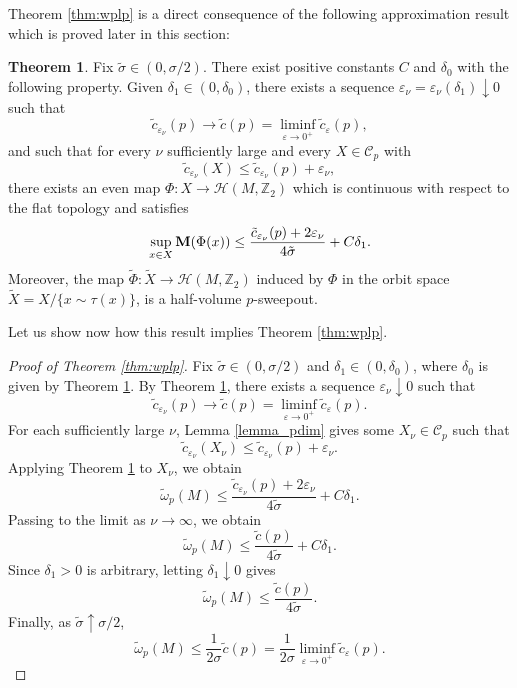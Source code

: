 \documentclass[12pt,english]{article}
\theoremstyle{definition}
\newtheorem{theorem}{Theorem}[section]
\begin{document}
Theorem \ref{thm:wplp} is a direct consequence of the following approximation result which is proved later in this section:

\begin{theorem} \label{thm:comp}
Fix $\tilde \sigma \in (0,\sigma/2)$. There exist positive constants $C$ and $\delta_0$ with the following property. Given $\delta_1 \in (0,\delta_0)$, there exists a sequence $\varepsilon_\nu=\varepsilon_\nu(\delta_1)\downarrow 0$ such that
\[
\tilde c_{\varepsilon_\nu}(p)\to \tilde c(p)=\liminf_{\varepsilon\to 0^+}\tilde c_\varepsilon(p),
\]
and such that for every $\nu$ sufficiently large and every $X \in \mathcal{C}_p$ with
\[
\tilde c_{\varepsilon_\nu}(X) \leq \tilde c_{\varepsilon_\nu}(p)+\varepsilon_\nu,
\]
there exists an even map $\Phi:X \to \mathcal H(M, \mathbb{Z}_2)$ which is continuous with respect to the flat topology and satisfies
\[
\sup_{x \in X} {\bf M}(\Phi(x)) \leq \frac{\tilde c_{\varepsilon_\nu}(p)+2\varepsilon_\nu}{4\tilde \sigma} + C\delta_1.
\]
Moreover, the map $\tilde \Phi:\tilde X \to \mathcal H(M, \mathbb{Z}_2)$ induced by $\Phi$ in the orbit space $\tilde X=X/\{x\sim \tau(x)\}$, is a half-volume $p$-sweepout.
\end{theorem}

Let us show now how this result implies Theorem \ref{thm:wplp}.

\begin{proof}[Proof of Theorem \ref{thm:wplp}]
Fix $\tilde \sigma \in (0,\sigma/2)$ and $\delta_1\in(0,\delta_0)$, where $\delta_0$ is given by Theorem \ref{thm:comp}. By Theorem \ref{thm:comp}, there exists a sequence $\varepsilon_\nu\downarrow 0$ such that
\[
\tilde c_{\varepsilon_\nu}(p)\to \tilde c(p)=\liminf_{\varepsilon\to 0^+}\tilde c_\varepsilon(p).
\]
For each sufficiently large $\nu$, Lemma \ref{lemma_pdim} gives some $X_\nu\in\mathcal C_p$ such that
\[
\tilde c_{\varepsilon_\nu}(X_\nu)\le \tilde c_{\varepsilon_\nu}(p)+\varepsilon_\nu.
\]
Applying Theorem \ref{thm:comp} to $X_\nu$, we obtain
\[
\tilde \omega_p(M) \leq \frac{\tilde c_{\varepsilon_\nu}(p)+2\varepsilon_\nu}{4\tilde \sigma}+C \delta_1.
\]
Passing to the limit as $\nu\to\infty$, we obtain
\[
\tilde \omega_p(M) \leq \frac{\tilde c(p)}{4\tilde \sigma}+C\delta_1.
\]
Since $\delta_1>0$ is arbitrary, letting $\delta_1\downarrow 0$ gives
\[
\tilde \omega_p(M) \leq \frac{\tilde c(p)}{4\tilde \sigma}.
\]
Finally, as $\tilde \sigma \uparrow \sigma/2$,
\[
\tilde \omega_p(M) \leq \frac{1}{2\sigma}\tilde c(p)
= \frac{1}{2\sigma}\liminf_{\varepsilon \to 0^+} \tilde c_\varepsilon(p).
\]
\end{proof}
\end{document}
